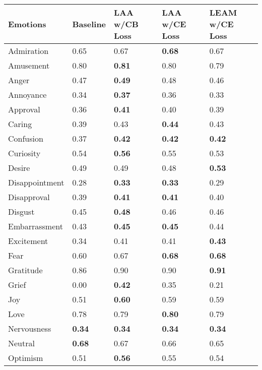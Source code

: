 \begin{table}[h]
    \begin{center}
    \begin{tabular}{|l|l|l|l|l|}
        \hline
        Emotions & Baseline & LAA w/CB Loss & LAA w/CE Loss & LEAM w/CE Loss  \\ %
        \hline
        Admiration &  0.65 & {0.67} & \textbf{0.68} & {0.67}\\
        Amusement & 0.80 & \textbf{0.81} & 0.80 & 0.79  \\
        Anger & 0.47 &\textbf{0.49} & {0.48} & 0.46 \\
        Annoyance & 0.34 &\textbf{0.37} & {0.36} & 0.33\\
        Approval & 0.36 & \textbf{0.41} & {0.40} & {0.39} \\
        Caring & 0.39 & {0.43} &  \textbf{0.44} & {0.43} \\
        Confusion & 0.37 &\textbf{0.42} & \textbf{0.42} & \textbf{0.42}\\
        Curiosity & 0.54 & \textbf{0.56} & {0.55} & 0.53\\
        Desire & {0.49} & {0.49} & 0.48 & \textbf{0.53}\\
        Disappointment & 0.28 &\textbf{0.33} & \textbf{0.33} & {0.29} \\
        Disapproval & 0.39 & \textbf{0.41} & \textbf{0.41} & {0.40}\\
        Disgust & 0.45 & \textbf{0.48} & {0.46} & {0.46}\\
        Embarrassment & 0.43 &\textbf{0.45} & \textbf{0.45} & {0.44}\\
        Excitement & 0.34 & {0.41} & {0.41} & \textbf{0.43}\\
        Fear &  0.60 & {0.67} & \textbf{0.68} & \textbf{0.68} \\
        Gratitude & 0.86 & {0.90} & {0.90} & \textbf{0.91}\\
        Grief & 0.00 & \textbf{0.42} & {0.35} & {0.21} \\
        Joy & 0.51 & \textbf{0.60} & {0.59} & {0.59} \\
        Love & 0.78 & {0.79} & \textbf{0.80} & {0.79}\\
        Nervousness & \textbf{0.34} & \textbf{0.34} & \textbf{0.34} & \textbf{0.34} \\
        Neutral & \textbf{0.68} & 0.67 & 0.66 & 0.65\\
        Optimism & 0.51 & \textbf{0.56} & {0.55} & {0.54} \\

\end{tabular}
\end{center}
\end{table}
